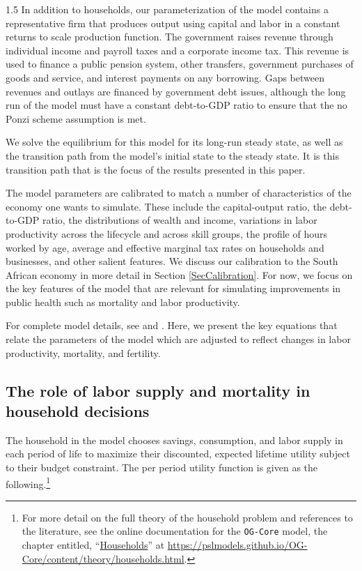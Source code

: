 \documentclass[letterpaper,12pt]{article}
\theoremstyle{definition}
\begin{document}
\begin{spacing}{1.5}
  In addition to households, our parameterization of the model contains a representative firm that produces output using capital and labor in a constant returns to scale production function.  The government raises revenue through individual income and payroll taxes and a corporate income tax.  This revenue is used to finance a public pension system, other transfers, government purchases of goods and service, and interest payments on any borrowing. Gaps between revenues and outlays are financed by government debt issues, although the long run of the model must have a constant debt-to-GDP ratio to ensure that the no Ponzi scheme assumption is met.

  We solve the equilibrium for this model for its long-run steady state, as well as the transition path from the model's initial state to the steady state. It is this transition path that is the focus of the results presented in this paper.

  The model parameters are calibrated to match a number of characteristics of the economy one wants to simulate. These include the capital-output ratio, the debt-to-GDP ratio, the distributions of wealth and income, variations in labor productivity across the lifecycle and across skill groups, the profile of hours worked by age, average and effective marginal tax rates on households and businesses, and other salient features.  We discuss our calibration to the South African economy in more detail in Section \ref{SecCalibration}. For now, we focus on the key features of the model that are relevant for simulating improvements in public health such as mortality and labor productivity.

  For complete model details, see \citet{OGCore} and \citet{DEP:2019}. Here, we present the key equations that relate the parameters of the model which are adjusted to reflect changes in labor productivity, mortality, and fertility.

    \subsection{The role of labor supply and mortality in household decisions}\label{SecLaborMort}

    The household in the model chooses savings, consumption, and labor supply in each period of life to maximize their discounted, expected lifetime utility subject to their budget constraint. The per period utility function is given as the following.\footnote{For more detail on the full theory of the household problem and references to the literature, see the online documentation for the \texttt{OG-Core} model, the chapter entitled, ``\href{https://pslmodels.github.io/OG-Core/content/theory/households.html}{Households}'' at \href{https://pslmodels.github.io/OG-Core/content/theory/households.html}{https://pslmodels.github.io/OG-Core/content/theory/households.html}.}


\end{spacing}
\end{document}
